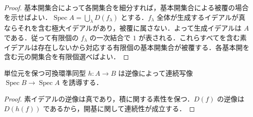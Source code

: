\begin{proof}
基本開集合によって各開集合を細分すれば，基本開集合による被覆の場合を示せばよい．$\operatorname{Spec}A=\bigcup_{\lambda}D(f_\lambda)$ とする．$f_\lambda$ 全体が生成するイデアルが真ならそれを含む極大イデアルがあり，被覆に属さない．よって生成イデアルは $A$ である．従って有限個の $f_\lambda$ の一次結合で $1$ が表される．これらすべてを含む素イデアルは存在しないから対応する有限個の基本開集合が被覆する．各基本開を含む元の開集合を有限個選べばよい．
\end{proof}
\begin{prop}[環準同型が誘導する連続写像]
単位元を保つ可換環準同型 $h:A\to B$ は逆像によって連続写像 $\operatorname{Spec}B\to\operatorname{Spec}A$ を誘導する．
\end{prop}
\begin{proof}
素イデアルの逆像は真であり，積に関する素性を保つ．$D(f)$ の逆像は $D(h(f))$ であるから，開基に関して連続性が成立する．
\end{proof}
